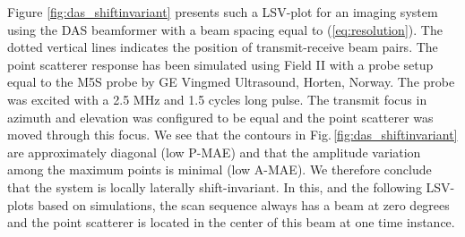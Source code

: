 \documentclass[journal]{IEEEtran}
\begin{document}
Figure \ref{fig:das_shiftinvariant} presents such a LSV-plot for an imaging system using the DAS beamformer with a beam spacing equal to (\ref{eq:resolution}). The dotted vertical lines indicates the position of transmit-receive beam pairs. The point scatterer response has been simulated using Field II \cite{Jensen1992, Jensen1996a} with a probe setup equal to the M5S probe by GE Vingmed Ultrasound, Horten, Norway. The probe was excited with a 2.5 MHz and 1.5 cycles long pulse. The transmit focus in azimuth and elevation was configured to be equal and the point scatterer was moved through this focus. We see that the contours in Fig.\,\ref{fig:das_shiftinvariant} are approximately diagonal (low P-MAE) and that the amplitude variation among the maximum points is minimal (low A-MAE). We therefore conclude that the system is locally laterally shift-invariant. In this, and the following LSV-plots based on simulations, the scan sequence always has a beam at zero degrees and the point scatterer is located in the center of this beam at one time instance.


\end{document}
